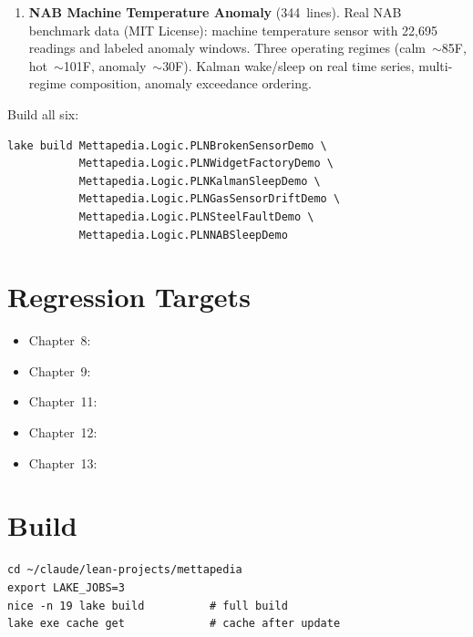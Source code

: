 \documentclass[11pt,openany]{report}
\begin{document}
\begin{enumerate}
\item \textbf{NAB Machine Temperature Anomaly} (344~lines).
  Real NAB benchmark data (MIT License): machine temperature sensor
  with 22,695 readings and labeled anomaly windows.  Three operating
  regimes (calm~$\sim$85\textdegree{}F, hot~$\sim$101\textdegree{}F,
  anomaly~$\sim$30\textdegree{}F).  Kalman wake/sleep on real
  time series, multi-regime composition, anomaly exceedance ordering.\\
\end{enumerate}

\noindent
Build all six:
\begin{lstlisting}
lake build Mettapedia.Logic.PLNBrokenSensorDemo \
           Mettapedia.Logic.PLNWidgetFactoryDemo \
           Mettapedia.Logic.PLNKalmanSleepDemo \
           Mettapedia.Logic.PLNGasSensorDriftDemo \
           Mettapedia.Logic.PLNSteelFaultDemo \
           Mettapedia.Logic.PLNNABSleepDemo
\end{lstlisting}

\section{Regression Targets}

\begin{itemize}
\item Chapter~8: 
\item Chapter~9: 
\item Chapter~11: 
\item Chapter~12: 
\item Chapter~13: 
\end{itemize}

\section{Build}

\begin{lstlisting}
cd ~/claude/lean-projects/mettapedia
export LAKE_JOBS=3
nice -n 19 lake build          # full build
lake exe cache get             # cache after update
\end{lstlisting}
\end{document}
